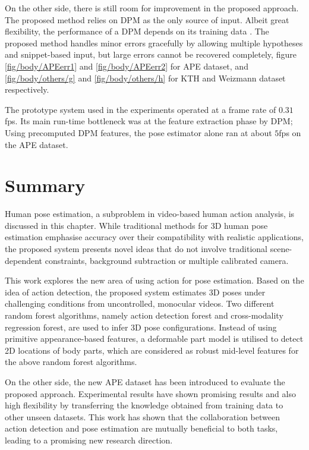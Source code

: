On the other side, there is still room for improvement in the proposed approach. The proposed method relies on DPM as the only source of input. Albeit great flexibility, the performance of a DPM depends on its training data \cite{Yang2011, Eichner2012}. The proposed method handles minor errors gracefully by allowing multiple hypotheses and snippet-based input, but large errors cannot be recovered completely, \eg figure \ref{fig/body/APEerr1} and \ref{fig/body/APEerr2} for APE dataset, and \ref{fig/body/others/g} and \ref{fig/body/others/h} for KTH and Weizmann dataset respectively. 

The prototype system used in the experiments operated at a frame rate of $0.31$fps. Its main run-time bottleneck was at the feature extraction phase by DPM; Using precomputed DPM features, the pose estimator alone ran at about $5$fps on the APE dataset. 



\section{Summary}
\label{sec/body/conclusions}

Human pose estimation, a subproblem in video-based human action analysis, is discussed in this chapter.  
While traditional methods for 3D human pose estimation emphasise accuracy over their compatibility with realistic applications, the proposed system presents novel ideas that do not involve traditional scene-dependent constraints, \eg background subtraction or multiple calibrated camera.

This work explores the new area of using action for pose estimation. 
Based on the idea of action detection, the proposed system estimates 3D poses under challenging conditions from uncontrolled, monocular videos.
Two different random forest algorithms, namely action detection forest and cross-modality regression forest, are used to infer 3D pose configurations. Instead of using primitive appearance-based features, a deformable part model is utilised to detect 2D locations of body parts, which are considered as robust mid-level features for the above random forest algorithms.

On the other side, the new APE dataset has been introduced to evaluate the proposed approach.  
Experimental results have shown promising results and also high flexibility by transferring the knowledge obtained from training data to other unseen datasets. This work has shown that the collaboration between action detection and pose estimation are mutually beneficial to both tasks, leading to a promising new research direction.
